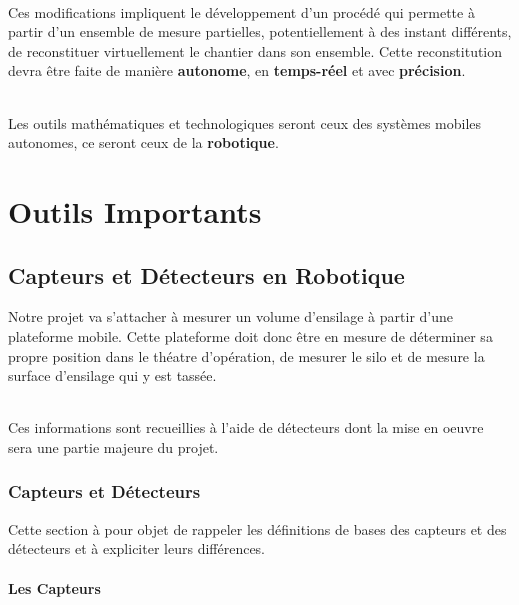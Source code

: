 \documentclass[12pt,a4paper]{report}
\begin{document}
\paragraph{}Ces modifications impliquent le développement d'un procédé qui permette à partir d'un ensemble de mesure partielles, potentiellement à des instant différents, de reconstituer virtuellement le chantier dans son ensemble. Cette reconstitution devra être faite de manière \textbf{autonome}, en \textbf{temps-réel} et avec \textbf{précision}.

\paragraph{}Les outils mathématiques et technologiques seront ceux des systèmes mobiles autonomes, ce seront ceux de la \textbf{robotique}.






\part{Outils Importants }

\chapter{Capteurs et Détecteurs en Robotique}

Notre projet va s'attacher à mesurer un volume d'ensilage à partir d'une plateforme mobile. Cette plateforme doit donc être en mesure de déterminer sa propre position dans le théatre d'opération, de mesurer le silo et de mesure la surface d'ensilage qui y est tassée.

\paragraph{} Ces informations sont recueillies à l'aide de détecteurs dont la mise en oeuvre sera une partie majeure du projet.

\section{Capteurs et Détecteurs}

Cette section à pour objet de rappeler les définitions de bases des capteurs et des détecteurs et à expliciter leurs différences.

\subsection{Les Capteurs}
\end{document}
